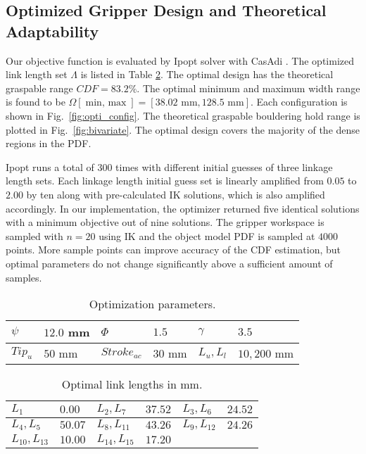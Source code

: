 \documentclass[letterpaper, 10 pt, conference]{ieeeconf}  %
\newcommand{\fig}[1]{Fig.~\ref{#1}}
\begin{document}
\subsection{Optimized Gripper Design and Theoretical Adaptability}
Our objective function is evaluated by Ipopt solver \cite{ipopt} with CasAdi \cite{casadi}. The optimized link length set $\Lambda$ is listed in Table \ref{tb:opti_link}. The optimal design has the theoretical graspable range $CDF = 83.2 \%$. The optimal minimum and maximum width range is found to be $\Omega [\operatorname{min,\ max}] = [38.02\text{ mm}, 128.5\text{ mm}]$. Each configuration is shown in \fig{fig:opti_config}. The theoretical graspable bouldering hold range is plotted in \fig{fig:bivariate}. The optimal design covers the majority of the dense regions in the PDF. 

Ipopt runs a total of 300 times with different initial guesses of three linkage length sets. Each linkage length initial guess set is linearly amplified from $0.05$ to $2.00$ by ten along with pre-calculated IK solutions, which is also amplified accordingly. 
In our implementation, the optimizer returned five identical solutions with a minimum objective out of nine solutions.
The gripper workspace is sampled with $n = 20$ using IK and the object model PDF is sampled at $4000$ points. More sample points can improve accuracy of the CDF estimation, but optimal parameters do not change significantly above a sufficient amount of samples.

\begin{table}[]
\centering
\caption{Optimization parameters.\label{tb:opti_params}}
\begin{tabular}{llllll}

$\psi$ & $12.0$ mm & $\Phi$ & $1.5$ & $\gamma$ & $3.5$ \\ \hline
$Tip_u$ & $50$ mm & $Stroke_{ac}$ & $30$ mm & $L_u,L_l$ & $10, 200$ mm\\ \hline

\end{tabular}
\end{table}

\begin{table}[]
\centering
\caption{Optimal link lengths in mm.\label{tb:opti_link}}
\begin{tabular}{llllll}
\hline

$L_1$         & $0.00$  & $L_2,L_7$  & $37.52$     & $L_3,L_6$  & $24.52$  \\ \hline
$L_4,L_5$      & $50.07$  & $L_8,L_{11}$    & $43.26$  & $L_9,L_{12}$ & $24.26$  \\ \hline
$L_{10},L_{13}$    & $10.00$  & $L_{14},L_{15}$   & $17.20$  &        &  \\ \hline
\end{tabular}
\end{table}
\end{document}
